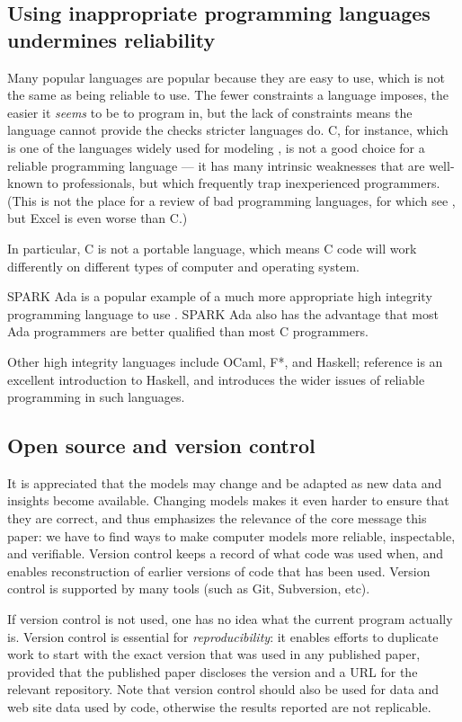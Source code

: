 \documentclass[10pt,a4paper]{article}
\begin{document}
\subsection{Using inappropriate programming languages undermines reliability}
Many popular languages are popular because they are easy to use, which is not the same as being reliable to use. The fewer constraints a language imposes, the easier it \emph{seems\/} to be to program in, but the lack of constraints means the language cannot provide the checks stricter languages do. C, for instance, which is one of the languages widely used for modeling \cite{tweet,plos}, is not a good choice for a reliable programming language --- it has many intrinsic weaknesses that are well-known to professionals, but which frequently trap inexperienced programmers. (This is not the place for a review of bad programming languages, for which see \cite{heedless}, but Excel is even worse than C\@.) 

In particular, C is not a portable language, which means C code will work differently on different types of computer and operating system. 

SPARK Ada is a popular example of a much more appropriate high integrity programming language to use \cite{spark}. SPARK Ada also has the advantage that most Ada programmers are better qualified than most C programmers. 

Other high integrity languages include  OCaml, F*, and Haskell; reference \cite{haskell} is an excellent introduction to Haskell, and introduces the wider issues of reliable programming in such languages.

\subsection{Open source and version control}
It is appreciated that the models may change and be adapted as new data and insights become available. Changing models makes it even harder to ensure that they are correct, and thus emphasizes the relevance of the core message this paper: we have to find ways to make computer models more reliable, inspectable, and verifiable. Version control keeps a record of what code was used when, and enables reconstruction of earlier versions of code that has been used. Version control is supported by many tools (such as Git, Subversion, etc). 

If version control is not used, one has no idea what the current program actually is. {Version control is essential for \emph{reproducibility\/}: \cite{basic-reproducibilty,reproducibility} it enables efforts to duplicate work to start with the exact version that was used in any published paper, provided that the published paper discloses the version and a URL for the relevant repository. Note that version control should also be used for data and web site data used by code, otherwise the results reported are not replicable.}
\end{document}
